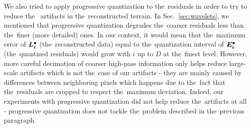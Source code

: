 We also tried to apply progressive quantization to the~residuals in order to try to reduce the~ artifacts in the~reconstructed terrain. In Sec.~\ref{sec:wavelets}, we mentioned that progressive quantization degrades the~coarser residuals less than the~finer (more detailed) ones. In our context, it would mean that the~maximum error of $\objdot{L}{i}$ (the~reconstructed data) equal to the~quantization interval of $\objdot{E}{i}$ (the~quantized residuals) would grow with $i$ up to $D$ at the~finest level. However, more careful decimation of coarser high-pass information only helps reduce large-scale artifacts which is not the~case of our artifacts - they are mainly caused by differences between neighboring pixels which happens due to the~fact that the~residuals are cropped to respect the~maximum deviation. Indeed, our experiments with progressive quantization did not help reduce the~artifacts at all - progressive quantization does not tackle the~problem described in the~previous paragraph.
